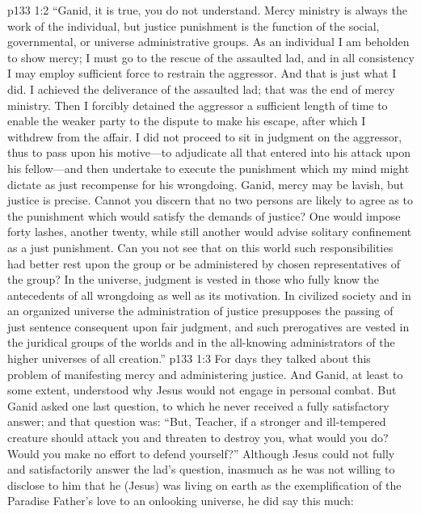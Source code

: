 \vs p133 1:2 \textcolor{ubdarkred}{“Ganid, it is true, you do not understand. Mercy ministry is always the work of the individual, but justice punishment is the function of the social, governmental, or universe administrative groups. As an individual I am beholden to show mercy; I must go to the rescue of the assaulted lad, and in all consistency I may employ sufficient force to restrain the aggressor. And that is just what I did. I achieved the deliverance of the assaulted lad; that was the end of mercy ministry. Then I forcibly detained the aggressor a sufficient length of time to enable the weaker party to the dispute to make his escape, after which I withdrew from the affair. I did not proceed to sit in judgment on the aggressor, thus to pass upon his motive---to adjudicate all that entered into his attack upon his fellow---and then undertake to execute the punishment which my mind might dictate as just recompense for his wrongdoing. Ganid, mercy may be lavish, but justice is precise. Cannot you discern that no two persons are likely to agree as to the punishment which would satisfy the demands of justice? One would impose forty lashes, another twenty, while still another would advise solitary confinement as a just punishment. Can you not see that on this world such responsibilities had better rest upon the group or be administered by chosen representatives of the group? In the universe, judgment is vested in those who fully know the antecedents of all wrongdoing as well as its motivation. In civilized society and in an organized universe the administration of justice presupposes the passing of just sentence consequent upon fair judgment, and such prerogatives are vested in the juridical groups of the worlds and in the all\hyp{}knowing administrators of the higher universes of all creation.”}
\vs p133 1:3 For days they talked about this problem of manifesting mercy and administering justice. And Ganid, at least to some extent, understood why Jesus would not engage in personal combat. But Ganid asked one last question, to which he never received a fully satisfactory answer; and that question was: “But, Teacher, if a stronger and ill\hyp{}tempered creature should attack you and threaten to destroy you, what would you do? Would you make no effort to defend yourself?” Although Jesus could not fully and satisfactorily answer the lad’s question, inasmuch as he was not willing to disclose to him that he (Jesus) was living on earth as the exemplification of the Paradise Father’s love to an onlooking universe, he did say this much:
